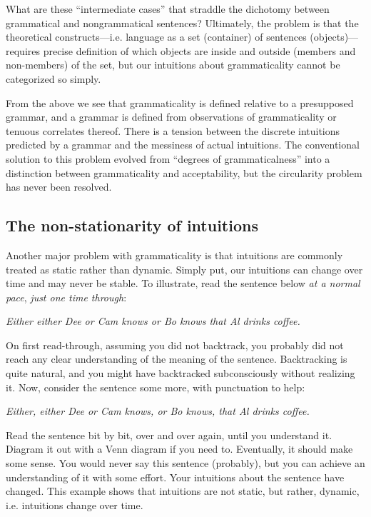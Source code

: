   What are these “intermediate cases” that straddle the dichotomy between grammatical and nongrammatical sentences? Ultimately, the problem is that the theoretical constructs—i.e. language as a set (container) of sentences (objects)—requires precise definition of which objects are inside and outside (members and non-members) of the set, but our intuitions about grammaticality cannot be categorized so simply.

  From the above we see that grammaticality is defined relative to a presupposed grammar, and a grammar is defined from observations of grammaticality or tenuous correlates thereof. There is a tension between the discrete intuitions predicted by a grammar and the messiness of actual intuitions. The conventional solution to this problem evolved from “degrees of grammaticalness” into a distinction between grammaticality and acceptability, but the circularity problem has never been resolved. 

\subsection{The non-stationarity of intuitions}

Another major problem with grammaticality is that intuitions are commonly treated as static rather than dynamic. Simply put, our intuitions can change over time and may never be stable. To illustrate, read the sentence below \textit{at a normal pace}, \textit{just one time through}:

    \textit{Either either Dee or Cam knows or Bo knows that Al drinks coffee.}

On first read-through, assuming you did not backtrack, you probably did not reach any clear understanding of the meaning of the sentence. Backtracking is quite natural, and you might have backtracked subconsciously without realizing it. Now, consider the sentence some more, with punctuation to help:

    \textit{Either, either Dee or Cam knows, or Bo knows, that Al drinks coffee.}

  Read the sentence bit by bit, over and over again, until you understand it. Diagram it out with a Venn diagram if you need to. Eventually, it should make some sense. You would never say this sentence (probably), but you can achieve an understanding of it with some effort. Your intuitions about the sentence have changed. This example shows that intuitions are not static, but rather, dynamic, i.e. intuitions change over time.


